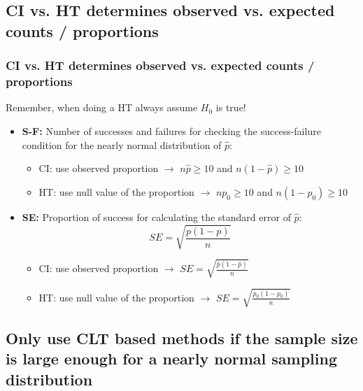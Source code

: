 \documentclass[slidestop,compress,mathserif,12pt,t,professionalfonts,xcolor=table]{beamer}
\begin{document}

\subsection{CI vs. HT determines observed vs. expected counts / proportions}
\label{mi3}


\begin{frame}
\frametitle{CI vs. HT determines observed vs. expected counts / proportions}

Remember, when doing a HT always assume $H_0$ is true!
\pause

\begin{itemize}

\item \textbf{S-F:} Number of successes and failures for checking the success-failure condition for the 
nearly normal distribution of $\hat{p}$:
\pause
\begin{itemize}
\item CI: use observed proportion $\rightarrow$ $n\hat{p} \ge 10$ and $n(1 - \hat{p}) \ge 10$
\pause
\item HT: use null value of the proportion $\rightarrow$ $np_0 \ge 10$ and $n(1 - p_0) \ge 10$
\end{itemize}

\pause

\item \textbf{SE:} Proportion of success for calculating the standard error of $\hat{p}$: 
\[ SE = \sqrt{\frac{p(1-p)}{n}} \]
\pause
\vspace{-0.5cm}
\begin{itemize}
\item CI: use observed proportion $\rightarrow$ $SE = \sqrt{\frac{\hat{p}(1-\hat{p})}{n}}$
\pause
\item HT: use null value of the proportion $\rightarrow$ $SE = \sqrt{\frac{p_0(1-p_0)}{n}}$
\end{itemize}

\end{itemize}

\end{frame}


\subsection{Only use CLT based methods if the sample size is large enough for a nearly normal sampling distribution}
\label{mi4}
\end{document}
